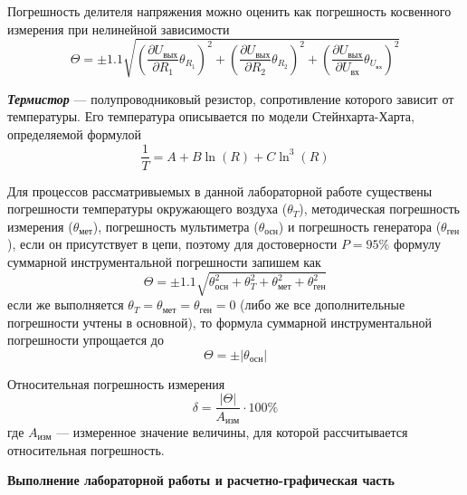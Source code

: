 \documentclass[12pt,a4paper]{article}
\begin{document}
Погрешность делителя напряжения можно оценить как погрешность косвенного измерения 
при нелинейной зависимости
\begin{equation}
\Theta = \pm 1.1\sqrt{\left(\frac{\partial U_{\text{вых}}}{\partial R_1}\theta_{R_1}\right)^2 + \left(\frac{\partial U_{\text{вых}}}{\partial R_2}\theta_{R_2}\right)^2 + \left(\frac{\partial U_{\text{вых}}}{\partial U_{\text{вх}}}\theta_{U_{\text{вх}}}\right)^2}
\label{accuracy_divider}
\end{equation}

\textbf{\textit{Термистор}} — полупроводниковый резистор, сопротивление которого 
зависит от температуры. Его температура описывается по модели Стейнхарта-Харта, определяемой 
формулой 
\begin{equation}
\frac{1}{T} = A + B \ln(R) + C \ln^3(R)
\label{steinhart_hart}
\end{equation}

Для процессов рассматривыемых в данной лабораторной работе существены погрешности 
температуры окружающего воздуха ($\theta_T$), методическая погрешность измерения ($\theta_{\text{мет}}$), 
погрешность мультиметра ($\theta_{\text{осн}}$) и 
погрешность генератора ($\theta_{\text{ген}}$), если он присутствует в цепи, поэтому для достоверности $P=95\%$ 
формулу суммарной инструментальной погрешности запишем как
\begin{equation}
\Theta = \pm 1.1\sqrt{\theta_{\text{осн}}^2 + \theta_{T}^2 + \theta_{\text{мет}}^2 + \theta_{\text{ген}}^2}
\label{total_accuracy}
\end{equation}
если же выполняется $\theta_T = \theta_{\text{мет}} = \theta_{\text{ген}} = 0$ 
(либо же все дополнительные погрешности учтены в основной), то формула суммарной 
инструментальной погрешности упрощается до
\begin{equation}
\Theta = \pm\left|\theta_{\text{осн}}\right|
\label{total_accuracy_simple}
\end{equation}

Относительная погрешность измерения 
\begin{equation}
\delta = \frac{\left|\Theta\right|}{A_\text{изм}} \cdot 100\%
\label{relative_accuracy}
\end{equation}
где $A_\text{изм}$ — измеренное значение величины, для которой рассчитывается относительная погрешность.

\pagebreak


\begin{center}
	\LARGE{\textbf{Выполнение лабораторной работы и расчетно-графическая часть}}
\end{center}
\end{document}
